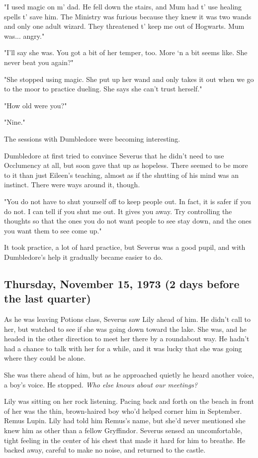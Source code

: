 \documentclass[a4paper,11pt]{article}
\begin{document}
"I used magic on m' dad. He fell down the stairs, and Mum had t' use healing spells t' save him. The Ministry was furious because they knew it was two wands and only one adult wizard. They threatened t' keep me out of Hogwarts. Mum was... angry."

"I'll say she was. You got a bit of her temper, too. More `n a bit seems like. She never beat you again?"

"She stopped using magic. She put up her wand and only takes it out when we go to the moor to practice dueling. She says she can't trust herself."

"How old were you?"

"Nine."

The sessions with Dumbledore were becoming interesting.

Dumbledore at first tried to convince Severus that he didn't need to use Occlumency at all, but soon gave that up as hopeless. There seemed to be more to it than just Eileen's teaching, almost as if the shutting of his mind was an instinct. There were ways around it, though.

"You do not have to shut yourself off to keep people out. In fact, it is safer if you do not. I can tell if you shut me out. It gives you away. Try controlling the thoughts so that the ones you do not want people to see stay down, and the ones you want them to see come up."

It took practice, a lot of hard practice, but Severus was a good pupil, and with Dumbledore's help it gradually became easier to do.

\subsection{Thursday, November 15, 1973 (2 days before the last quarter)}

As he was leaving Potions class, Severus saw Lily ahead of him. He didn't call to her, but watched to see if she was going down toward the lake. She was, and he headed in the other direction to meet her there by a roundabout way. He hadn't had a chance to talk with her for a while, and it was lucky that she was going where they could be alone.

She was there ahead of him, but as he approached quietly he heard another voice, a boy's voice. He stopped. \emph{Who else knows about our meetings?}

Lily was sitting on her rock listening. Pacing back and forth on the beach in front of her was the thin, brown-haired boy who'd helped corner him in September. Remus Lupin. Lily had told him Remus's name, but she'd never mentioned she knew him as other than a fellow Gryffindor. Severus sensed an uncomfortable, tight feeling in the center of his chest that made it hard for him to breathe. He backed away, careful to make no noise, and returned to the castle.
\end{document}
